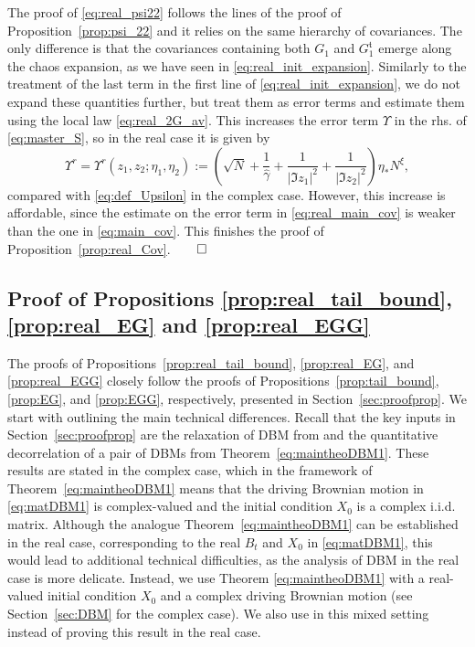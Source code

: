 \documentclass[10pt]{amsart}
\numberwithin{equation}{section}
\begin{document}
The proof of \eqref{eq:real_psi22} follows the lines of the proof of Proposition~\ref{prop:psi_22} and it relies on the same hierarchy of covariances. The only difference is that the covariances containing both $G_1$ and $G_1^\mathfrak{t}$ emerge along the chaos expansion, as we have seen in \eqref{eq:real_init_expansion}. Similarly to the treatment of the last term in the first line of \eqref{eq:real_init_expansion}, we do not expand these quantities further, but treat them as error terms and estimate them using the local law \eqref{eq:real_2G_av}. This increases the error term $\Upsilon$ in the rhs. of \eqref{eq:master_S}, so in the real case it is given by
\begin{equation}
\Upsilon^r=\Upsilon^r(z_1,z_2;\eta_1,\eta_2):=\left(\sqrt{N}+\frac{1}{\widehat{\gamma}} + \frac{1}{|\Im z_1|^2} + \frac{1}{|\Im z_2|^2}\right)\eta_* N^\xi,
\end{equation}
compared with \eqref{eq:def_Upsilon} in the complex case. However, this increase is affordable, since the estimate on the error term in \eqref{eq:real_main_cov} is weaker than the one in \eqref{eq:main_cov}. This finishes the proof of Proposition~\ref{prop:real_Cov}.\hfill$\qed$

\subsection{Proof of Propositions \ref{prop:real_tail_bound}, \ref{prop:real_EG} and \ref{prop:real_EGG}}\label{sec:real_crit_scale}

The proofs of Propositions~\ref{prop:real_tail_bound}, \ref{prop:real_EG}, and \ref{prop:real_EGG} closely follow the proofs of Propositions~\ref{prop:tail_bound}, \ref{prop:EG}, and \ref{prop:EGG}, respectively, presented in Section~\ref{sec:proofprop}. We start with outlining the main technical differences. Recall that the key inputs in Section~\ref{sec:proofprop} are the relaxation of DBM from \cite[Proposition~4.6]{bourgade2024fluctuations} and the quantitative decorrelation of a pair of DBMs from Theorem~\ref{eq:maintheoDBM1}. These results are stated in the complex case, which in the framework of Theorem~\ref{eq:maintheoDBM1} means that the driving Brownian motion in \eqref{eq:matDBM1} is complex-valued and the initial condition $X_0$ is a complex i.i.d. matrix. Although the analogue Theorem~\ref{eq:maintheoDBM1} can be established in the real case, corresponding to the real $B_t$ and $X_0$ in \eqref{eq:matDBM1}, this would lead to additional technical difficulties, as the analysis of DBM in the real case is more delicate. Instead, we use Theorem \ref{eq:maintheoDBM1} with a real-valued initial condition $X_0$ and a complex driving Brownian motion (see Section~\ref{sec:DBM} for the complex case). We also use \cite[Proposition~4.6]{bourgade2024fluctuations} in this mixed setting instead of proving this result in the real case.
\end{document}
